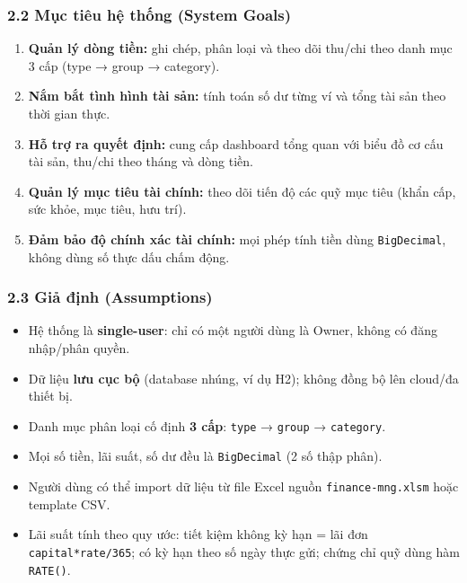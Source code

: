 \documentclass[11pt,a4paper]{article}
\providecommand{\tightlist}{%
  \setlength{\itemsep}{0pt}\setlength{\parskip}{0pt}}
\begin{document}
\subsubsection{2.2 Mục tiêu hệ thống (System Goals)}\label{mux1ee5c-tiuxeau-hux1ec7-thux1ed1ng-system-goals}

\begin{enumerate}
\def\labelenumi{\arabic{enumi}.}
\tightlist
\item
  \textbf{Quản lý dòng tiền:} ghi chép, phân loại và theo dõi thu/chi
  theo danh mục 3 cấp (type → group → category).
\item
  \textbf{Nắm bắt tình hình tài sản:} tính toán số dư từng ví và tổng
  tài sản theo thời gian thực.
\item
  \textbf{Hỗ trợ ra quyết định:} cung cấp dashboard tổng quan với biểu
  đồ cơ cấu tài sản, thu/chi theo tháng và dòng tiền.
\item
  \textbf{Quản lý mục tiêu tài chính:} theo dõi tiến độ các quỹ mục tiêu
  (khẩn cấp, sức khỏe, mục tiêu, hưu trí).
\item
  \textbf{Đảm bảo độ chính xác tài chính:} mọi phép tính tiền dùng
  \texttt{BigDecimal}, không dùng số thực dấu chấm động.
\end{enumerate}

\subsubsection{2.3 Giả định (Assumptions)}\label{giux1ea3-ux111ux1ecbnh-assumptions}

\begin{itemize}
\tightlist
\item
  Hệ thống là \textbf{single-user}: chỉ có một người dùng là Owner,
  không có đăng nhập/phân quyền.
\item
  Dữ liệu \textbf{lưu cục bộ} (database nhúng, ví dụ H2); không
  đồng bộ lên cloud/đa thiết bị.
\item
  Danh mục phân loại cố định \textbf{3 cấp}: \texttt{type} →
  \texttt{group} → \texttt{category}.
\item
  Mọi số tiền, lãi suất, số dư đều là \texttt{BigDecimal} (2 số thập
  phân).
\item
  Người dùng có thể import dữ liệu từ file Excel nguồn
  \texttt{finance-mng.xlsm} hoặc template CSV.
\item
  Lãi suất tính theo quy ước: tiết kiệm không kỳ hạn = lãi đơn
  \texttt{capital*rate/365}; có kỳ hạn theo số ngày thực gửi; chứng chỉ
  quỹ dùng hàm \texttt{RATE()}.
\end{itemize}
\end{document}

